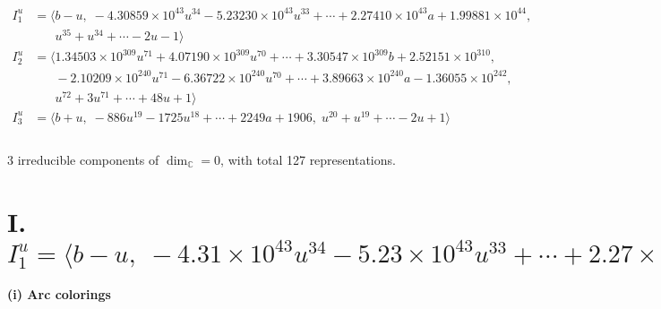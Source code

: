 \documentclass[1p]{elsarticle_modified}
\theoremstyle{definition}
\begin{document}
\begin{align*}
I^u_{1}&=\langle 
b- u,\;-4.30859\times10^{43} u^{34}-5.23230\times10^{43} u^{33}+\cdots+2.27410\times10^{43} a+1.99881\times10^{44},\\
\phantom{I^u_{1}}&\phantom{= \langle  }u^{35}+u^{34}+\cdots-2 u-1\rangle \\
I^u_{2}&=\langle 
1.34503\times10^{309} u^{71}+4.07190\times10^{309} u^{70}+\cdots+3.30547\times10^{309} b+2.52151\times10^{310},\\
\phantom{I^u_{2}}&\phantom{= \langle  }-2.10209\times10^{240} u^{71}-6.36722\times10^{240} u^{70}+\cdots+3.89663\times10^{240} a-1.36055\times10^{242},\\
\phantom{I^u_{2}}&\phantom{= \langle  }u^{72}+3 u^{71}+\cdots+48 u+1\rangle \\
I^u_{3}&=\langle 
b+u,\;-886 u^{19}-1725 u^{18}+\cdots+2249 a+1906,\;u^{20}+u^{19}+\cdots-2 u+1\rangle \\
\\
\end{align*}
\raggedright * 3 irreducible components of $\dim_{\mathbb{C}}=0$, with total 127 representations.\\
\newpage
\renewcommand{\arraystretch}{1}
\centering \section*{I. $I^u_{1}= \langle b- u,\;-4.31\times10^{43} u^{34}-5.23\times10^{43} u^{33}+\cdots+2.27\times10^{43} a+2.00\times10^{44},\;u^{35}+u^{34}+\cdots-2 u-1 \rangle$}
\flushleft \textbf{(i) Arc colorings}\\
\end{document}
